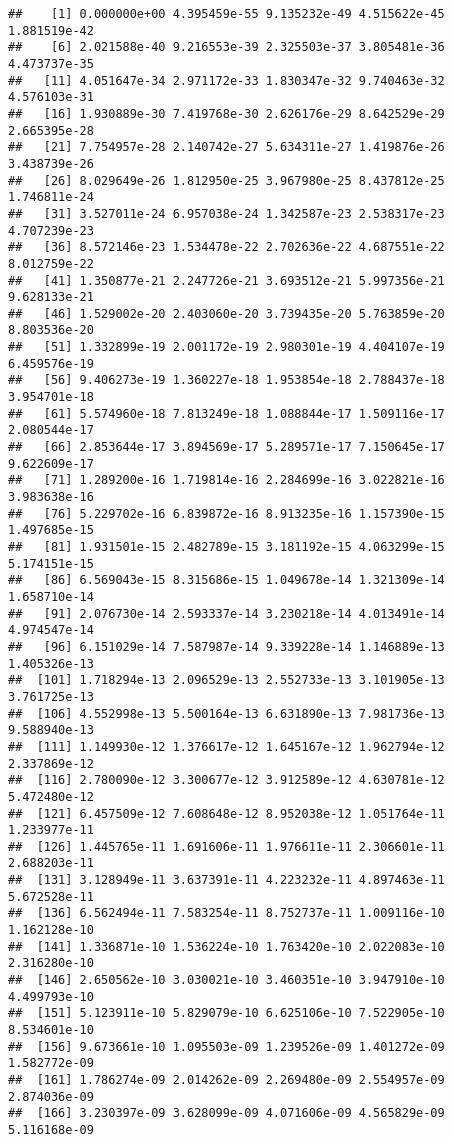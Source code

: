 \documentclass[
]{article}
\begin{document}
\begin{verbatim}
##    [1] 0.000000e+00 4.395459e-55 9.135232e-49 4.515622e-45 1.881519e-42
##    [6] 2.021588e-40 9.216553e-39 2.325503e-37 3.805481e-36 4.473737e-35
##   [11] 4.051647e-34 2.971172e-33 1.830347e-32 9.740463e-32 4.576103e-31
##   [16] 1.930889e-30 7.419768e-30 2.626176e-29 8.642529e-29 2.665395e-28
##   [21] 7.754957e-28 2.140742e-27 5.634311e-27 1.419876e-26 3.438739e-26
##   [26] 8.029649e-26 1.812950e-25 3.967980e-25 8.437812e-25 1.746811e-24
##   [31] 3.527011e-24 6.957038e-24 1.342587e-23 2.538317e-23 4.707239e-23
##   [36] 8.572146e-23 1.534478e-22 2.702636e-22 4.687551e-22 8.012759e-22
##   [41] 1.350877e-21 2.247726e-21 3.693512e-21 5.997356e-21 9.628133e-21
##   [46] 1.529002e-20 2.403060e-20 3.739435e-20 5.763859e-20 8.803536e-20
##   [51] 1.332899e-19 2.001172e-19 2.980301e-19 4.404107e-19 6.459576e-19
##   [56] 9.406273e-19 1.360227e-18 1.953854e-18 2.788437e-18 3.954701e-18
##   [61] 5.574960e-18 7.813249e-18 1.088844e-17 1.509116e-17 2.080544e-17
##   [66] 2.853644e-17 3.894569e-17 5.289571e-17 7.150645e-17 9.622609e-17
##   [71] 1.289200e-16 1.719814e-16 2.284699e-16 3.022821e-16 3.983638e-16
##   [76] 5.229702e-16 6.839872e-16 8.913235e-16 1.157390e-15 1.497685e-15
##   [81] 1.931501e-15 2.482789e-15 3.181192e-15 4.063299e-15 5.174151e-15
##   [86] 6.569043e-15 8.315686e-15 1.049678e-14 1.321309e-14 1.658710e-14
##   [91] 2.076730e-14 2.593337e-14 3.230218e-14 4.013491e-14 4.974547e-14
##   [96] 6.151029e-14 7.587987e-14 9.339228e-14 1.146889e-13 1.405326e-13
##  [101] 1.718294e-13 2.096529e-13 2.552733e-13 3.101905e-13 3.761725e-13
##  [106] 4.552998e-13 5.500164e-13 6.631890e-13 7.981736e-13 9.588940e-13
##  [111] 1.149930e-12 1.376617e-12 1.645167e-12 1.962794e-12 2.337869e-12
##  [116] 2.780090e-12 3.300677e-12 3.912589e-12 4.630781e-12 5.472480e-12
##  [121] 6.457509e-12 7.608648e-12 8.952038e-12 1.051764e-11 1.233977e-11
##  [126] 1.445765e-11 1.691606e-11 1.976611e-11 2.306601e-11 2.688203e-11
##  [131] 3.128949e-11 3.637391e-11 4.223232e-11 4.897463e-11 5.672528e-11
##  [136] 6.562494e-11 7.583254e-11 8.752737e-11 1.009116e-10 1.162128e-10
##  [141] 1.336871e-10 1.536224e-10 1.763420e-10 2.022083e-10 2.316280e-10
##  [146] 2.650562e-10 3.030021e-10 3.460351e-10 3.947910e-10 4.499793e-10
##  [151] 5.123911e-10 5.829079e-10 6.625106e-10 7.522905e-10 8.534601e-10
##  [156] 9.673661e-10 1.095503e-09 1.239526e-09 1.401272e-09 1.582772e-09
##  [161] 1.786274e-09 2.014262e-09 2.269480e-09 2.554957e-09 2.874036e-09
##  [166] 3.230397e-09 3.628099e-09 4.071606e-09 4.565829e-09 5.116168e-09

\end{verbatim}
\end{document}

